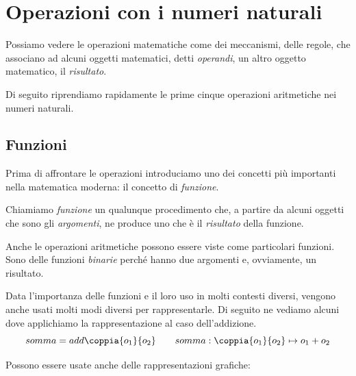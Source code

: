 \section{Operazioni con i numeri naturali}
\label{sec:nat_operazioni}

Possiamo vedere le operazioni matematiche come dei meccanismi, delle regole, 
che associano ad alcuni oggetti matematici, detti \emph{operandi}, 
un altro oggetto matematico, il \emph{risultato}.

Di seguito riprendiamo rapidamente le prime cinque operazioni aritmetiche 
nei numeri naturali. 

\subsection{Funzioni}

Prima di affrontare le operazioni introduciamo uno dei concetti più importanti
nella matematica moderna: il concetto di \emph{funzione}.

\begin{definizione}{}{}
Chiamiamo \emph{funzione} un qualunque procedimento che, 
a partire da alcuni oggetti che sono gli \emph{argomenti}, 
ne produce uno che è il \emph{risultato} della funzione.
\end{definizione}

Anche le operazioni aritmetiche possono essere viste come particolari
funzioni. Sono delle funzioni \emph{binarie} perché hanno due argomenti e,
ovviamente, un risultato.

Data l'importanza delle funzioni e il loro uso in molti contesti diversi, 
vengono anche usati molti modi diversi per rappresentarle. 
Di seguito ne vediamo alcuni dove applichiamo la rappresentazione al caso
dell'addizione.
\[somma = add \coppia{o_1}{o_2} \qquad
  somma: \coppia{o_1}{o_2} \mapsto o_1 + o_2\]

Possono essere usate anche delle rappresentazioni grafiche:

